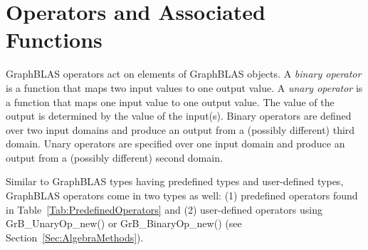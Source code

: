 \section{Operators and Associated Functions}

GraphBLAS operators act on elements of GraphBLAS objects.   A
 \emph{binary operator} is a function that maps two input
values to one output value. A \emph{unary operator} is a function that 
maps one input value to one output value. The value of the output is 
determined by the value of the input(s).  Binary operators are defined over 
two input domains and produce an output from a (possibly different) third 
domain. Unary operators are specified over one input domain and produce an 
output from a (possibly different) second domain.

Similar to GraphBLAS types having predefined types and user-defined types, 
GraphBLAS operators come in two types as well: (1) predefined operators 
found in Table~\ref{Tab:PredefinedOperators} and (2) user-defined operators 
using {\sf GrB\_UnaryOp\_new()} or {\sf GrB\_BinaryOp\_new()} (see Section~\ref{Sec:AlgebraMethods}).

